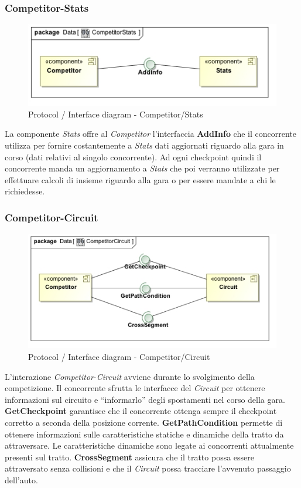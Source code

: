 \subsubsection{Competitor-Stats}
\begin{center}
\begin{figure}[h!]
	\includegraphics[scale=0.55]{img/InteractionDiagram/Implementation_Diagram__CompetitorStats.jpg}
\caption{Protocol / Interface diagram - Competitor/Stats}
\end{figure}
\end{center}
La componente \emph{Stats} offre al \emph{Competitor} l'interfaccia \textbf{AddInfo} che il concorrente utilizza per fornire costantemente a \emph{Stats}
dati aggiornati riguardo alla gara in corso (dati relativi al singolo concorrente). Ad ogni checkpoint quindi il concorrente manda un aggiornamento
a \emph{Stats} che poi verranno utilizzate per effettuare calcoli di insieme riguardo alla gara o per essere mandate a chi le richiedesse.
\subsubsection{Competitor-Circuit}
\begin{center}
\begin{figure}[h!]
	\includegraphics[scale=0.55]{img/InteractionDiagram/Implementation_Diagram__CompetitorCircuit.jpg}
\caption{Protocol / Interface diagram - Competitor/Circuit}
\end{figure}
\end{center}
L'interazione \emph{Competitor}-\emph{Circuit} avviene durante lo svolgimento della competizione. Il concorrente sfrutta le interfacce del \emph{Circuit}
per ottenere informazioni sul circuito e ``informarlo'' degli spostamenti nel corso della gara.\\
\textbf{GetCheckpoint} garantisce che il concorrente ottenga sempre il checkpoint corretto a seconda della posizione corrente.
\textbf{GetPathCondition} permette di ottenere informazioni sulle caratteristiche statiche e dinamiche della tratto da attraversare. Le caratteristiche 
dinamiche sono legate ai concorrenti attualmente presenti sul tratto.
\textbf{CrossSegment} assicura che il tratto possa essere attraversato senza collisioni e che il \emph{Circuit} possa tracciare l'avvenuto passaggio 
dell'auto.
